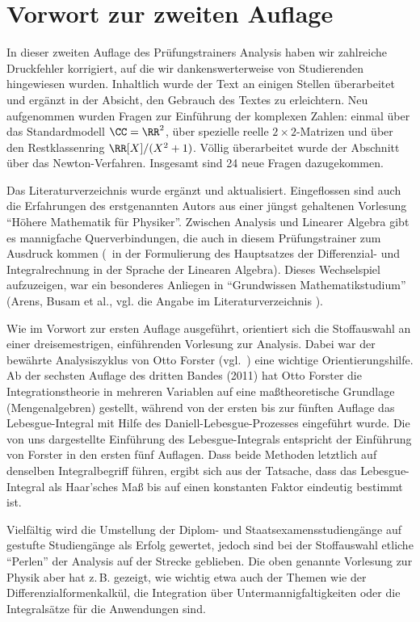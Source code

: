 \chapter*{Vorwort zur zweiten Auflage}

In dieser zweiten Auflage des Prüfungstrainers Analysis haben wir zahlreiche 
Druckfehler korrigiert, auf die wir dankenswerterweise von Studierenden 
hingewiesen wurden. Inhaltlich wurde der Text an einigen Stellen überarbeitet und ergänzt in 
der Absicht, den Gebrauch des Textes zu erleichtern. 
Neu aufgenommen wurden Fragen zur Einführung der komplexen Zahlen:  
einmal über das Standardmodell $\CC=\RR^2$, über spezielle reelle $2\times 2$-Matrizen 
und über den Restklassenring $\RR[X]/(X^2+1)$. Völlig überarbeitet wurde der 
Abschnitt über das Newton-Verfahren. Insgesamt sind 24 neue Fragen dazugekommen.

Das Literaturverzeichnis wurde ergänzt und aktualisiert. Eingeflossen sind auch 
die Erfahrungen des erstgenannten Autors aus einer jüngst gehaltenen Vorlesung 
"`Höhere Mathematik für Physiker"'. Zwischen Analysis und Linearer Algebra gibt es mannigfache Querverbindungen, die auch in diesem Prüfungstrainer zum Ausdruck kommen (\zB\ in der 
Formulierung des Hauptsatzes der Differenzial- und Integralrechnung in der 
Sprache der Linearen Algebra). Dieses Wechselspiel aufzuzeigen, war ein 
besonderes Anliegen  in  "`Grundwissen Mathematikstudium"' 
(Arens, Busam  et al., vgl. die Angabe im Literaturverzeichnis \citep{Arens}).

Wie im Vorwort zur ersten Auflage ausgeführt, orientiert sich die Stoffauswahl 
an einer dreisemestrigen, einführenden Vorlesung zur Analysis. Dabei war der bewährte 
Analysiszyklus von Otto Forster (vgl.~\citep{Forster}) 
eine wichtige Orientierungshilfe. Ab der sechsten Auflage 
des dritten Bandes (2011) hat Otto Forster die Integrationstheorie in mehreren 
Variablen auf eine maßtheoretische Grundlage (Mengenalgebren) gestellt, während 
von der ersten bis zur fünften Auflage das Lebesgue-Integral mit Hilfe des 
Daniell-Lebesgue-Prozesses eingeführt wurde. Die von uns dargestellte Einführung des 
Lebesgue-Integrals entspricht der Einführung von Forster in den ersten fünf Auflagen. 
Dass beide Methoden letztlich auf denselben Integralbegriff führen, ergibt sich aus der 
Tatsache, dass das Lebesgue-Integral als Haar'sches Maß bis auf einen 
konstanten Faktor eindeutig bestimmt ist. 

Vielfältig wird die Umstellung der Diplom- und Staatsexamensstudiengänge auf 
gestufte Studiengänge als Erfolg gewertet, jedoch sind bei der Stoffauswahl 
etliche "`Perlen"' der Analysis auf der Strecke geblieben. Die oben genannte 
Vorlesung zur Physik aber hat z.\,B. gezeigt, wie wichtig etwa auch der Themen 
wie der Differenzialformenkalkül, 
die Integration über Untermannigfaltigkeiten oder die 
Integralsätze für die Anwendungen sind. 
 
